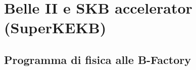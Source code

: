 \chapter{Belle II e SKB accelerator (SuperKEKB)}

\begin{comment}
Belle II è un esperimento general-purpose utilizzato nello studio dei parametri del Modello Standard (MS) e nella ricerca di Fisica oltre il MS (Beyond Standard Model, BSM).
In particolare l'esperimento studia la violazione di CP nei sistemi di mesoni B e cerca evidenze di Nuova Fisica (New Physic, NP) nei decadimenti dei mesoni B, dei mesoni D, nei leptoni $\tau$ e nel dark sector (settore della materia oscura), in particolare dei fotoni oscuri.
\end{comment}

\section{Programma di fisica alle B-Factory}

